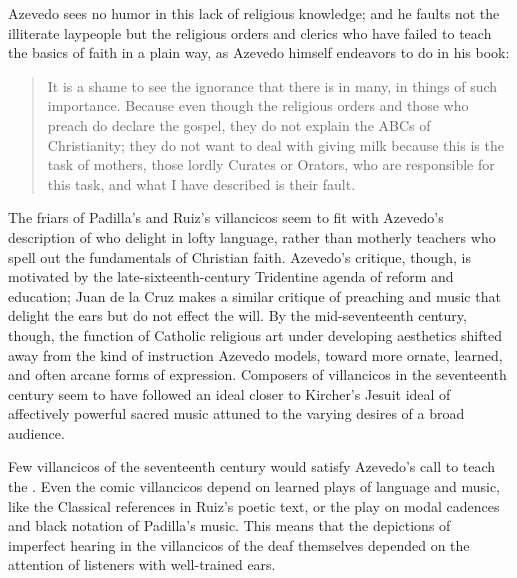 Azevedo sees no humor in this lack of religious knowledge; and he faults not 
the illiterate laypeople but the religious orders and clerics who have failed 
to teach the basics of faith in a plain way, as Azevedo himself endeavors to do 
in his book:
\begin{quote}
    It is a shame to see the ignorance that there is in many, in things of such 
    importance.
    \Dots{} Because even though the religious orders and those who preach do 
    declare the gospel, 
    they do not explain the ABCs  of Christianity;
    they do not want to deal with giving milk because this is the task of 
    mothers, those lordly Curates or Orators, who are responsible for this task, 
    and what I have described is their fault.%
        \Autocite
        [27: ] 
        {Azevedo:Catecismo}
\end{quote}

The friars of Padilla's and Ruiz's villancicos seem to fit with Azevedo's 
description of  who delight in lofty language, rather 
than motherly teachers who spell out the fundamentals of Christian faith.
Azevedo's critique, though, is motivated by the late-sixteenth-century 
Tridentine agenda of reform and education; Juan de la Cruz makes a similar
critique of preaching and music that delight the ears but do not effect the
will.
By the mid-seventeenth century, though, the function of Catholic religious art
under developing  aesthetics shifted away from the kind of
 instruction Azevedo models, toward more ornate, learned, and
often arcane forms of expression.
Composers of villancicos in the seventeenth century seem to have followed an
ideal closer to Kircher's Jesuit ideal of affectively powerful sacred music
attuned to the varying desires of a broad audience.

Few villancicos of the seventeenth century would satisfy Azevedo's call to 
teach the .
Even the comic villancicos depend on learned plays of language and music, like 
the Classical references in Ruiz's poetic text, or the play on modal cadences 
and black notation of Padilla's music.
This means that the depictions of imperfect hearing in the villancicos of the 
deaf themselves depended on the attention of listeners with well-trained ears.

